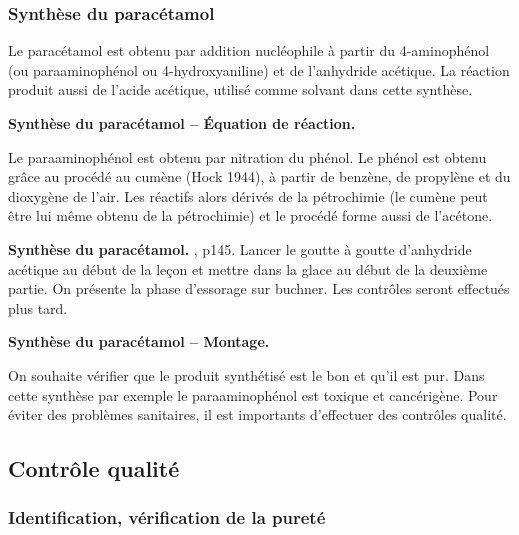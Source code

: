\subsubsection{Synthèse du paracétamol}

Le paracétamol est obtenu par addition nucléophile à partir du 4-aminophénol (ou paraaminophénol ou 4-hydroxyaniline) et de l'anhydride acétique.
La réaction produit aussi de l'acide acétique, utilisé comme solvant dans cette synthèse.

\begin{slide}
\textbf{Synthèse du paracétamol -- Équation de réaction.}
\end{slide}

\begin{remarque}
Le paraaminophénol est obtenu par nitration du phénol.
Le phénol est obtenu grâce au procédé au cumène (Hock 1944), à partir de benzène, de propylène et du dioxygène de l'air.
Les réactifs alors dérivés de la pétrochimie (le cumène peut être lui même obtenu de la pétrochimie) et le procédé forme aussi de l'acétone.
\end{remarque}

\begin{experience}
\textbf{Synthèse du paracétamol.}
\cite{Mesplede2002}, p145.
Lancer le goutte à goutte d'anhydride acétique au début de la leçon et mettre dans la glace au début de la deuxième partie.
On présente la phase d'essorage sur buchner.
Les contrôles seront effectués plus tard.
\end{experience}

\begin{slide}
\textbf{Synthèse du paracétamol -- Montage.}
\end{slide}

\begin{transition}
On souhaite vérifier que le produit synthétisé est le bon et qu'il est pur.
Dans cette synthèse par exemple le paraaminophénol est toxique et cancérigène.
Pour éviter des problèmes sanitaires, il est importants d'effectuer des contrôles qualité. 
\end{transition}

\subsection{Contrôle qualité}

\subsubsection{Identification, vérification de la pureté}


